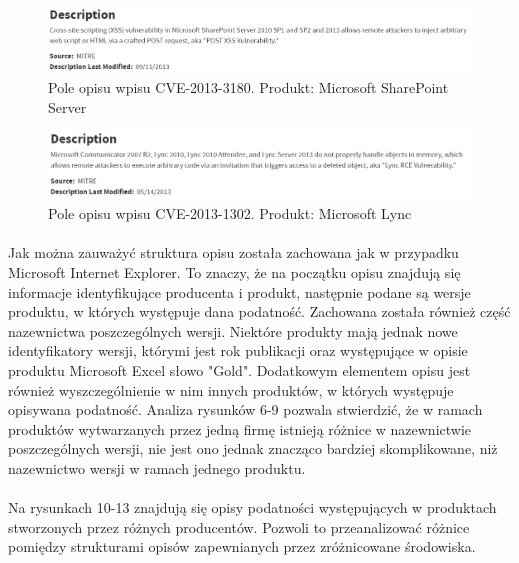 \documentclass[a4paper,12pt,twoside]{article}
\begin{document}
\begin{figure}
    \centering
    \includegraphics[width=1.0\textwidth]{image/008CVE20133180.png}
    \caption{Pole opisu wpisu CVE-2013-3180. Produkt: Microsoft SharePoint Server}
    \label{fig:Rysunek 8}
\end{figure}

\begin{figure}
    \centering
    \includegraphics[width=1.0\textwidth]{image/009CVE20131302.png}
    \caption{Pole opisu wpisu CVE-2013-1302. Produkt: Microsoft Lync}
    \label{fig:Rysunek 9}
\end{figure}

\paragraph{}
Jak można zauważyć struktura opisu została zachowana jak w przypadku Microsoft Internet Explorer. To znaczy, że na początku opisu znajdują się informacje identyfikujące producenta i produkt, następnie podane są wersje produktu, w których występuje dana podatność. Zachowana została również część nazewnictwa poszczególnych wersji. Niektóre produkty mają jednak nowe identyfikatory wersji, którymi jest rok publikacji oraz występujące w opisie produktu Microsoft Excel słowo "Gold". Dodatkowym elementem opisu jest również wyszczególnienie w nim innych produktów, w których występuje opisywana podatność. Analiza rysunków 6-9 pozwala stwierdzić, że w ramach produktów wytwarzanych przez jedną firmę istnieją różnice w nazewnictwie poszczególnych wersji, nie jest ono jednak znacząco bardziej skomplikowane, niż nazewnictwo wersji w ramach jednego produktu.

\paragraph{}
Na rysunkach 10-13 znajdują się opisy podatności występujących w produktach stworzonych przez różnych producentów. Pozwoli to przeanalizować różnice pomiędzy strukturami opisów zapewnianych przez zróżnicowane środowiska.
\end{document}
